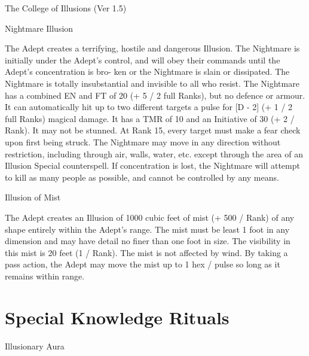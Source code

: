 \begin{Chapter}{The College of Illusions (Ver 1.5)}
\begin{spell}[S-14]{Nightmare Illusion}
\begin{effects}
The Adept creates a terrifying, hostile and dangerous Illusion.  The
Nightmare is initially under the Adept’s control, and will obey their
commands until the Adept’s concentration is bro- ken or the Nightmare
is slain or dissipated.  The Nightmare is totally insubstantial and
invisible to all who resist.  The Nightmare has a combined EN and FT
of 20 (+ 5 / 2 full Ranks), but no defence or armour. It can
automatically hit up to two different targets a pulse for [D - 2] (+ 1
/ 2 full Ranks) magical damage. It has a TMR of 10 and an Initiative
of 30 (+ 2 / Rank).  It may not be stunned.  At Rank 15, every target
must make a fear check upon first being struck. The Nightmare may move
in any direction without restriction, including through air, walls,
water, etc.  except through the area of an Illusion Special
counterspell.  If concentration is lost, the Nightmare will attempt to
kill as many people as possible, and cannot be controlled by any
means.
\end{effects}
\end{spell}

\begin{spell}[S-12]{Illusion of Mist}

\begin{effects}
The Adept creates an Illusion of 1000 cubic feet of mist (+ 500 /
Rank) of any shape entirely within the Adept’s range. The mist must be
least 1 foot in any dimension and may have detail no finer than one
foot in size. The visibility in this mist is 20 feet (1 / Rank). The
mist is not affected by wind.  By taking a pass action, the Adept may
move the mist up to 1 hex / pulse so long as it remains within range.
\end{effects}
\end{spell}


\section{Special Knowledge Rituals}

\begin{ritual}[R-1]{Illusionary Aura}


\end{ritual}
\end{Chapter}
